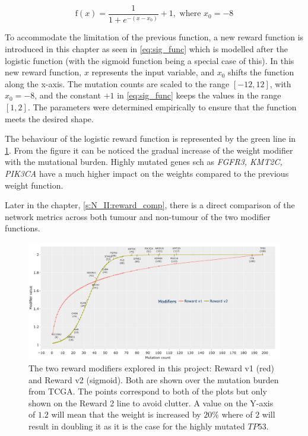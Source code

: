 \begin{equation} \label{eq:sig_func}
\text{f}(x) =  \frac{1}{1 + e^{-(x - x_0)}} + 1, \text{ where } x_0=-8
\end{equation}

To accommodate the limitation of the previous function, a new reward function is introduced in this chapter as seen in \cref{eq:sig_func} which is modelled after the logistic function (with the sigmoid function being a special case of this). In this new reward function, $x$ represents the input variable, and $x_0$ shifts the function along the x-axis. The mutation counts are scaled to the range $[-12, 12]$, with $x_0 = -8$, and the constant $+1$ in \cref{eq:sig_func} keeps the values in the range $[1, 2]$. The parameters were determined empirically to ensure that the function meets the desired shape.

The behaviour of the logistic reward function is represented by the green line in \cref{fig:N_II:modifiers_comp}. From the figure it can be noticed the gradual increase of the weight modifier with the mutational burden. Highly mutated genes sch as \textit{FGFR3, KMT2C, PIK3CA} have a much higher impact on the weights compared to the previous weight function. 

Later in the chapter, \cref{s:N_II:reward_comp}, there is a direct comparison of the network metrics across both tumour and non-tumour of the two modifier functions.

\begin{figure}[H]    
    \centering
    \includegraphics[width=1.0\textwidth,height=1.0\textheight,keepaspectratio]{Sections/Network_II/validation/reward_modifiers.png}
    \caption{The two reward modifiers explored in this project: Reward v1 (red) and Reward v2 (sigmoid). Both are shown over the mutation burden from TCGA. The points correspond to both of the plots but only shown on the Reward 2 line to avoid clutter. A value on the Y-axis of $1.2$ will mean that the weight is increased by $20\%$ where of $2$ will result in doubling it as it is the case for the highly mutated $TP53$. }
    \label{fig:N_II:modifiers_comp}
\end{figure}




